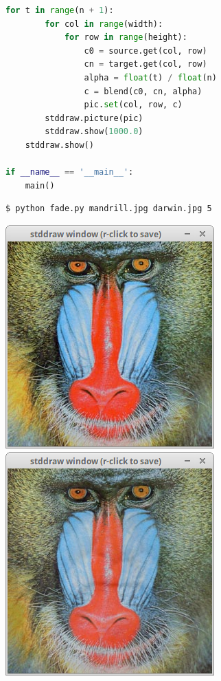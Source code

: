\documentclass[8pt,a4paper,compress,handout]{beamer}
\begin{document}
\begin{frame}[fragile]
\begin{lstlisting}[language=Python]
    for t in range(n + 1):
        for col in range(width):
            for row in range(height):
                c0 = source.get(col, row)
                cn = target.get(col, row)
                alpha = float(t) / float(n)
                c = blend(c0, cn, alpha)
                pic.set(col, row, c)
        stddraw.picture(pic)
        stddraw.show(1000.0)
    stddraw.show()

if __name__ == '__main__':
    main()
\end{lstlisting}

\begin{lstlisting}[language={}]
$ python fade.py mandrill.jpg darwin.jpg 5
\end{lstlisting}
\begin{minipage}{300pt}
\includegraphics[scale=0.15]{figures/fade1.png}\hfill
\includegraphics[scale=0.15]{figures/fade2.png}\hfill

\end{minipage}
\end{frame}
\end{document}
